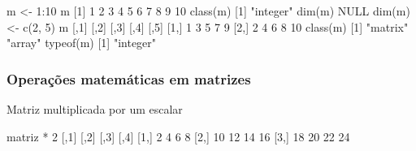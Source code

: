 \documentclass[
  10pt,
  a4paper]{book}
\newenvironment{Shaded}{\begin{snugshade}}{\end{snugshade}}
\newcommand{\ConstantTok}[1]{\textcolor[rgb]{0.00,0.00,0.00}{#1}}
\newcommand{\DecValTok}[1]{\textcolor[rgb]{0.00,0.00,0.81}{#1}}
\newcommand{\FunctionTok}[1]{\textcolor[rgb]{0.00,0.00,0.00}{#1}}
\newcommand{\NormalTok}[1]{#1}
\newcommand{\OtherTok}[1]{\textcolor[rgb]{0.56,0.35,0.01}{#1}}
\newcommand{\SpecialCharTok}[1]{\textcolor[rgb]{0.00,0.00,0.00}{#1}}
\newcommand{\StringTok}[1]{\textcolor[rgb]{0.31,0.60,0.02}{#1}}
\begin{document}
\begin{Shaded}
\begin{Highlighting}[]
\NormalTok{m }\OtherTok{\textless{}{-}} \DecValTok{1}\SpecialCharTok{:}\DecValTok{10}
\NormalTok{m}
\NormalTok{ [}\DecValTok{1}\NormalTok{]  }\DecValTok{1}  \DecValTok{2}  \DecValTok{3}  \DecValTok{4}  \DecValTok{5}  \DecValTok{6}  \DecValTok{7}  \DecValTok{8}  \DecValTok{9} \DecValTok{10}
\FunctionTok{class}\NormalTok{(m)}
\NormalTok{[}\DecValTok{1}\NormalTok{] }\StringTok{"integer"}
\FunctionTok{dim}\NormalTok{(m)}
\ConstantTok{NULL}
\FunctionTok{dim}\NormalTok{(m) }\OtherTok{\textless{}{-}} \FunctionTok{c}\NormalTok{(}\DecValTok{2}\NormalTok{, }\DecValTok{5}\NormalTok{)}
\NormalTok{m}
\NormalTok{     [,}\DecValTok{1}\NormalTok{] [,}\DecValTok{2}\NormalTok{] [,}\DecValTok{3}\NormalTok{] [,}\DecValTok{4}\NormalTok{] [,}\DecValTok{5}\NormalTok{]}
\NormalTok{[}\DecValTok{1}\NormalTok{,]    }\DecValTok{1}    \DecValTok{3}    \DecValTok{5}    \DecValTok{7}    \DecValTok{9}
\NormalTok{[}\DecValTok{2}\NormalTok{,]    }\DecValTok{2}    \DecValTok{4}    \DecValTok{6}    \DecValTok{8}   \DecValTok{10}
\FunctionTok{class}\NormalTok{(m)}
\NormalTok{[}\DecValTok{1}\NormalTok{] }\StringTok{"matrix"} \StringTok{"array"} 
\FunctionTok{typeof}\NormalTok{(m)}
\NormalTok{[}\DecValTok{1}\NormalTok{] }\StringTok{"integer"}
\end{Highlighting}
\end{Shaded}

\hypertarget{operauxe7uxf5es-matemuxe1ticas-em-matrizes}{%
\subsubsection{Operações matemáticas em matrizes}\label{operauxe7uxf5es-matemuxe1ticas-em-matrizes}}

Matriz multiplicada por um escalar

\begin{Shaded}
\begin{Highlighting}[]
\NormalTok{matriz }\SpecialCharTok{*} \DecValTok{2}
\NormalTok{     [,}\DecValTok{1}\NormalTok{] [,}\DecValTok{2}\NormalTok{] [,}\DecValTok{3}\NormalTok{] [,}\DecValTok{4}\NormalTok{]}
\NormalTok{[}\DecValTok{1}\NormalTok{,]    }\DecValTok{2}    \DecValTok{4}    \DecValTok{6}    \DecValTok{8}
\NormalTok{[}\DecValTok{2}\NormalTok{,]   }\DecValTok{10}   \DecValTok{12}   \DecValTok{14}   \DecValTok{16}
\NormalTok{[}\DecValTok{3}\NormalTok{,]   }\DecValTok{18}   \DecValTok{20}   \DecValTok{22}   \DecValTok{24}
\end{Highlighting}
\end{Shaded}
\end{document}
